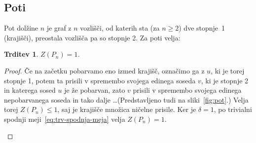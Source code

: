 \documentclass[12pt,a4paper,twoside]{article}
\theoremstyle{definition} %
\theoremstyle{plain} %
\newtheorem{trditev}[definicija]{Trditev}
\numberwithin{equation}{section}  %
\begin{document}
\subsection{Poti}
Pot dolžine $n$ je graf z $n$ vozlišči, od katerih sta (za $n \geq 2$) dve stopnje~1 (krajišči), preostala vozlišča pa so stopnje 2. Za poti velja:
\begin{trditev}
    $Z(P_n) = 1$.
    \label{trd:pot}
\end{trditev}
\begin{proof}
    Če na začetku pobarvamo eno izmed krajišč, označimo ga z $u$, ki je torej stopnje 1, potem ta prisili v spremembo svojega edinega soseda $v$, ki je stopnje 2 in katerega sosed $u$ je že pobarvan, zato $v$ prisili v spremembo svojega edinega nepobarvanega soseda in tako dalje \ldots (Predstavljeno tudi na sliki~\ref{fig:pot}.) Velja torej $Z(P_n) \leq 1$, saj je krajišče množica ničelne prisile. Ker je $\delta = 1$, po trivialni spodnji meji~\ref{eq:trv-spodnja-meja} velja $Z(P_n) = 1$.
    \begin{figure}[h]
        \begin{subfigure}{0.5\textwidth}
            \centering
        \end{subfigure}
        \begin{subfigure}{0.49\textwidth}
            \centering
\end{subfigure}
\end{figure}
\end{proof}
\end{document}
